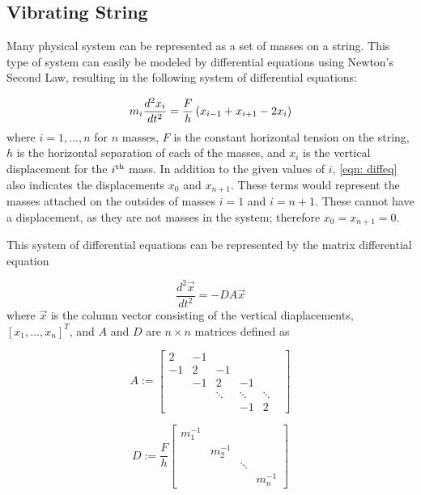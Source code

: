 \documentclass[10pt,a4paper]{article}
\begin{document}
\begin{multicols*}{2}
\section*{Vibrating String}

Many physical system can be represented as a set of masses on a string. This type of system can easily be modeled by differential equations using Newton's Second Law, resulting in the following system of differential equations:

\begin{equation}
	m_i \frac{d^2 x_i}{dt^2} = \frac{F}{h} \left(  x_{i-1} + x_{i+1} -2 x_i \right)
	\label{eqn: diffeq}
\end{equation}
where $i = 1, ..., n$ for $n$ masses, $F$ is the constant horizontal tension on the string, $h$ is the horizontal separation of each of the masses, and $x_i$ is the vertical displacement for the $i^{\rm{th}}$ mass. In addition to the given values of $i$, \cref{eqn: diffeq} also indicates the displacements $x_0$ and $x_{n+1}$. These terms would represent the masses attached on the outsides of masses $i = 1$ and $i = n+1$. These cannot have a displacement, as they are not masses in the system; therefore $x_0 = x_{n+1} = 0$.

This system of differential equations can be represented by the matrix differential equation

\begin{equation}
	\frac{d^2 \vec{x}}{dt^2} = -DA \vec{x}
	\label{eqn: matrixdiffeq}
\end{equation}
where $\vec{x}$ is the column vector consisting of the vertical diaplacements, $ \left[ x_1, ..., x_n \right]^T$, and $A$ and $D$ are $n \times n$ matrices defined as

$$
A :=
	\begin{bmatrix}
		2 & -1 &  & & &  \\
		-1 & 2 & -1 &   & &  \\
		   & -1 & 2 & -1 \\
		   & & \ddots & \ddots & \ddots  \\
		   &  & & -1 & 2
	\end{bmatrix}
$$



$$
D := \frac{F}{h} 
	\begin{bmatrix}
		m_1^{-1} \\
		& m_2^{-1} \\
		& & \ddots \\
		& & & m_n^{-1}
	\end{bmatrix}
$$


\end{multicols*}
\end{document}
